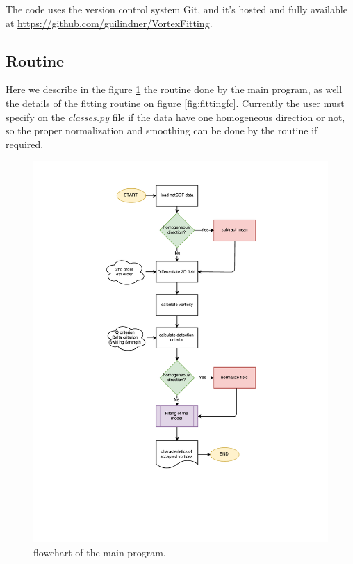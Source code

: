 \documentclass[12pt, a4paper, openany]{memoir}
\begin{document}
The code uses the version control system Git, and it's hosted and fully available at \url{https://github.com/guilindner/VortexFitting}. 

\newpage
\subsection{Routine}

Here we describe in the figure \ref{fig:mainprogramfc} the routine done by the main program, as well the details of the fitting routine on figure \ref{fig:fittingfc}. Currently the user must specify on the \textit{classes.py} file if the data have one homogeneous direction or not, so the proper normalization and smoothing can be done by the routine if required.

\begin{figure}[h!]
	\centering
	\includegraphics[trim=150 150 150 50 ,clip, scale=0.8]{figure/vortexFittingFlow.pdf}
	\caption{flowchart of the main program.}
	\label{fig:mainprogramfc}
\end{figure}
\end{document}
